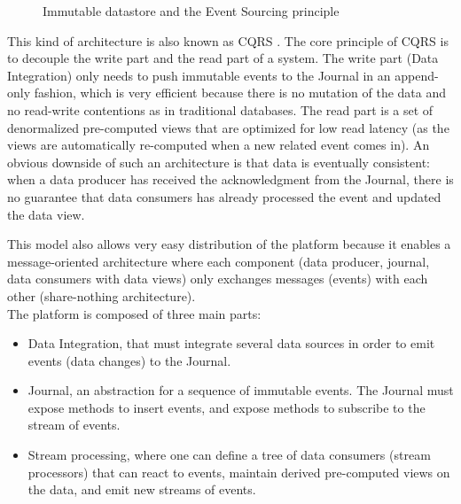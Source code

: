 \begin{figure}[h]
  \begin{center}
    \caption{Immutable datastore and the Event Sourcing principle}
    \label{fig:event-sourcing}
  \end{center}
\end{figure}

This kind of architecture is also known as CQRS . The core principle of CQRS is to decouple the write part and the read part
of a system. The write part (Data Integration) only needs to push immutable events to the Journal in an append-only fashion, which
is very efficient because there is no mutation of the data and no read-write contentions as in traditional databases.
The read part is a set of denormalized pre-computed views that are optimized for low read latency (as the views are automatically re-computed
when a new related event comes in).
An obvious downside of such an architecture is that data is eventually consistent: when a data producer has received the acknowledgment
from the Journal, there is no guarantee that data consumers has already processed the event and updated the data view.

This model also allows very easy distribution of the platform because it enables a message-oriented
architecture where each component (data producer, journal, data consumers with data views) only exchanges messages (events) with each other (share-nothing architecture).
\\

The platform is composed of three main parts: 
\begin{itemize}
  \item Data Integration, that must integrate several data sources in order to emit 
events (data changes) to the Journal. 
  \item Journal, an abstraction for a sequence of immutable events. The Journal must expose methods to insert events,
  and expose methods to subscribe to the stream of events.
  \item Stream processing, where one can define a tree of data consumers (stream processors) that can react to
  events, maintain derived pre-computed views on the data, and emit new streams of events.
\end{itemize}

